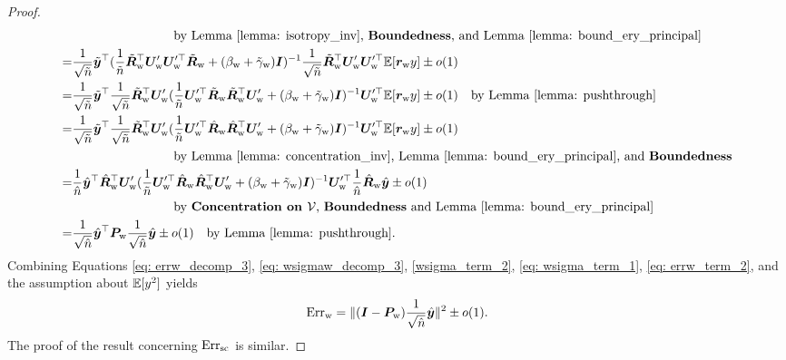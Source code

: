 \begin{proof}
\begin{align}
    &\quad\quad\quad\quad\quad\quad\quad\quad\text{by Lemma \ref{lemma: isotropy_inv}, \textbf{Boundedness}{}, and Lemma \ref{lemma: bound_ery_principal}}\\
    \nonumber
    = & \frac{1}{\sqrt{\tilde{n}}}\tilde{{\bm{y}}}^\top (\frac{1}{\tilde{n}}\tilde{{\bm{R}}}_{\text{w}}^\top {\bm{U}}_{\text{w}}'{\bm{U}}_{\text{w}}'^\top \tilde{{\bm{R}}}_{\text{w}} + (\beta_{\text{w}}+\tilde{\gamma}_{\text{w}}){\bm{I}} )^{-1}  \frac{1}{\sqrt{\tilde{n}}}\tilde{{\bm{R}}}_{\text{w}}^\top {\bm{U}}_{\text{w}}'{\bm{U}}_{\text{w}}'^\top \mathbb{E}[{\bm{r}}_{\text{w}} y] \pm o(1) \\
    \nonumber
    = & \frac{1}{\sqrt{\tilde{n}}}\tilde{{\bm{y}}}^\top \frac{1}{\sqrt{\tilde{n}}}\tilde{{\bm{R}}}_{\text{w}}^\top {\bm{U}}_{\text{w}}' (\frac{1}{\tilde{n}}{\bm{U}}_{\text{w}}'^\top \tilde{{\bm{R}}}_{\text{w}} \tilde{{\bm{R}}}_{\text{w}}^\top {\bm{U}}_{\text{w}}'+ (\beta_{\text{w}}+\tilde{\gamma}_{\text{w}}){\bm{I}} )^{-1}  {\bm{U}}_{\text{w}}'^\top \mathbb{E}[{\bm{r}}_{\text{w}} y] \pm o(1)\quad\text{by Lemma \ref{lemma: pushthrough}}\\
    \nonumber
    = & \frac{1}{\sqrt{\tilde{n}}}\tilde{{\bm{y}}}^\top \frac{1}{\sqrt{\tilde{n}}}\tilde{{\bm{R}}}_{\text{w}}^\top {\bm{U}}_{\text{w}}' (\frac{1}{\tilde{n}}{\bm{U}}_{\text{w}}'^\top \hat{{\bm{R}}}_{\text{w}} \hat{{\bm{R}}}_{\text{w}}^\top {\bm{U}}_{\text{w}}'+ (\beta_{\text{w}}+\tilde{\gamma}_{\text{w}}){\bm{I}} )^{-1}  {\bm{U}}_{\text{w}}'^\top \mathbb{E}[{\bm{r}}_{\text{w}} y] \pm o(1)\\
    \nonumber
    &\quad\quad\quad\quad\quad\quad\quad\quad\text{by Lemma \ref{lemma: concentration_inv}, Lemma \ref{lemma: bound_ery_principal}, and \textbf{Boundedness}{}}\\
    \nonumber
    = & \frac{1}{\hat{n}}\hat{{\bm{y}}}^\top \hat{{\bm{R}}}_{\text{w}}^\top {\bm{U}}_{\text{w}}' (\frac{1}{\tilde{n}}{\bm{U}}_{\text{w}}'^\top \hat{{\bm{R}}}_{\text{w}} \hat{{\bm{R}}}_{\text{w}}^\top {\bm{U}}_{\text{w}}'+ (\beta_{\text{w}}+\tilde{\gamma}_{\text{w}}){\bm{I}} )^{-1}  {\bm{U}}_{\text{w}}'^\top \frac{1}{\hat{n}}\hat{{\bm{R}}}_{\text{w}}\hat{{\bm{y}}} \pm o(1) \\
    \nonumber
&\quad\quad\quad\quad\quad\quad\quad\quad\text{by \textbf{Concentration on ${\mathcal{V}}$}{}, \textbf{Boundedness}{} and Lemma \ref{lemma: bound_ery_principal}}\\
\label{eq: errw_term_2}
= & \frac{1}{\sqrt{\hat{n}}}\hat{{\bm{y}}}^\top {\bm{P}}_{\text{w}} \frac{1}{\sqrt{\hat{n}}}\hat{{\bm{y}}}\pm o (1) \quad\text{by Lemma \ref{lemma: pushthrough}}.
\end{align}
Combining Equations \ref{eq: errw_decomp_3}, \ref{eq: wsigmaw_decomp_3}, \ref{wsigma_term_2}, \ref{eq: wsigma_term_1}, \ref{eq: errw_term_2}, and the assumption about $\mathbb{E}[y^2]$ yields
\begin{align}
    \nonumber
    \text{Err}_{\text{w}} = \| ({\bm{I}}-{\bm{P}}_{\text{w}})\frac{1}{\sqrt{\hat{n}}}\hat{{\bm{y}}} \|^2 \pm o (1).
\end{align}
The proof of the result concerning $\text{Err}_{\text{sc}}$ is similar.
\end{proof}


